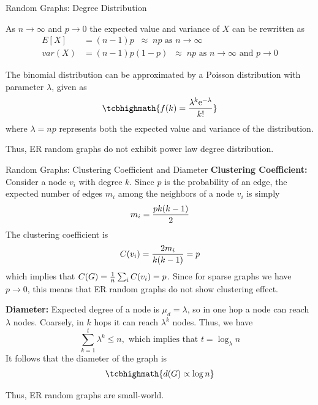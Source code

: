 \begin{frame}{Random Graphs: Degree Distribution}

As $n \to \infty$ and $p \to 0$
the expected value and
variance of $X$ can be rewritten as
\begin{align*}
    E[X] & = (n-1)p \;\; \approx \; np \text{ as } n \to \infty\\
    var(X) & = (n-1)p(1-p) \;\; \approx \; np \text{ as } n \to \infty
    \text{ and } p \to 0
\end{align*}

\medskip
The binomial distribution can be approximated by a Poisson
distribution with parameter $\lambda$, given as
\begin{align*}
\tcbhighmath{
f(k) = {\lambda^k \mathrm{e}^{-\lambda} \over k!}
}
\end{align*}
where $\lambda = np$ represents both the expected value and
variance of the distribution.

\medskip
Thus, ER random graphs do not exhibit power law degree distribution.
\end{frame}


\begin{frame}{Random Graphs: Clustering Coefficient and Diameter}
\small
{\bf Clustering Coeff\/{i}cient:}
Consider a node $v_i$ with degree $k$.
Since $p$ is the
probability of an edge, the expected number of edges $m_i$ among
the neighbors of a node $v_i$ is simply
$$m_i = {p k (k-1) \over 2}$$
The clustering coefficient is 
$$C(v_i) = {2m_i \over k(k-1)} = p$$
which implies that $C(G) = {1 \over n} \sum_i C(v_i) = p$.
\smallskip
Since for sparse graphs we have $p \to 0$, this means that ER random
graphs do not show clustering effect.

\bigskip
{\bf Diameter:}
Expected degree of a node is $\mu_d=\lambda$, so in
one hop a node can reach $\lambda$ nodes. 
Coarsely, in $k$ hops it can reach $\lambda^k$ nodes. Thus, we have
$$\sum_{k=1}^t \lambda^k \le n,
\text{ which implies that }
t = \log_{\lambda} n$$
It follows that
the diameter of the graph is
\begin{align*}
\tcbhighmath{
d(G) \propto \log n
}
\end{align*}

Thus, ER random graphs are small-world.
\end{frame}


